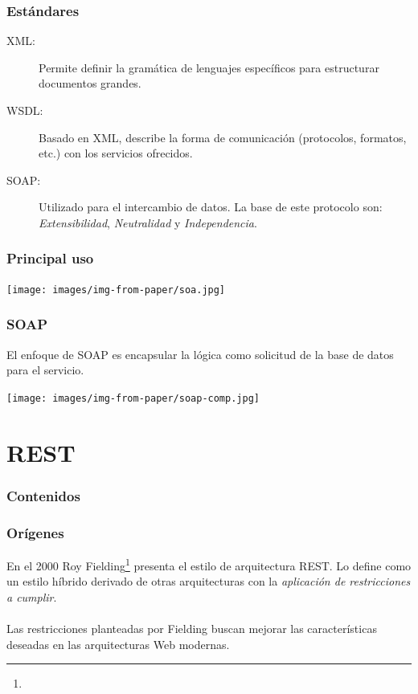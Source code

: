 \documentclass{beamer}
\begin{document}
\begin{frame}{\insertsection{}}
  \frametitle{Estándares}
  \begin{description}
  \item[XML:] Permite definir la gramática de lenguajes
    específicos para estructurar documentos grandes.
  \item[WSDL:] Basado en XML, describe la forma de
    comunicación (protocolos, formatos, etc.) con los servicios
    ofrecidos.
  \item[SOAP:] Utilizado para el intercambio de datos. La base de este
    protocolo son: \emph{Extensibilidad}, \emph{Neutralidad} y
    \emph{Independencia}.
  \end{description}
\end{frame}

\begin{frame}{\insertsection{}}
  \frametitle{Principal uso}
  \centering
  \texttt{[image: images/img-from-paper/soa.jpg]}
\end{frame}

\begin{frame}{\insertsection{}}
  \frametitle{SOAP}
  El enfoque de SOAP es encapsular la lógica como solicitud de la base
  de datos para el servicio. 

  \vfill

  \centering
  \texttt{[image: images/img-from-paper/soap-comp.jpg]}
\end{frame}

\section{REST}

\begin{frame}
  \frametitle{Contenidos}
\end{frame}

\begin{frame}{\insertsection{}}
  \frametitle{Orígenes}
  En el 2000 Roy
    Fielding\footnote{}
    presenta el estilo de arquitectura REST. Lo define como un estilo
    híbrido derivado de otras arquitecturas con la \emph{aplicación de
    restricciones a cumplir}.
  \\~\\
  Las restricciones planteadas por Fielding buscan mejorar las
  características deseadas en las arquitecturas Web modernas. 
\end{frame}
\end{document}
